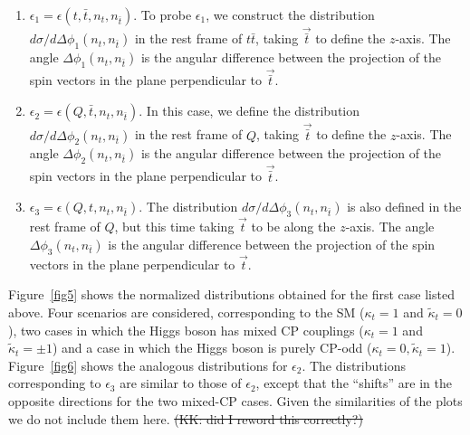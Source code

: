 \documentclass[aps,preprint,tightenlines,floatfix,superscriptaddress,nofootinbib,showpacs]{revtex4-1}
\def\tbar{\bar{t}}
\def\kp{\kappa_t}
\def\kpt{\tilde{\kappa}_t}
\def\TPa{\epsilon(t,\tbar,n_t,n_{\tbar})}
\def\TPb{\epsilon(Q,\tbar,n_t,n_{\tbar})}
\def\TPc{\epsilon(Q,t,n_t,n_{\tbar})}
\providecommand{\DIFdel}[1]{{\protect\color{red}\sout{#1}}}                      %
\providecommand{\DIFdelbegin}{} %
\providecommand{\DIFdelend}{} %
\begin{document}
 \begin{enumerate} 
\item {\boldmath $\epsilon_1 = \TPa$.}  To probe $\epsilon_1$, we construct
  the distribution
  $d\sigma/d\Delta\phi_1(n_t,n_{\tbar})$ in the rest frame of $t\tbar$,
  taking $\vec{\tbar}$ to define the $z$-axis. The angle
  $\Delta\phi_1(n_t,n_{\tbar})$ is the angular difference between the
  projection of the spin vectors in the plane perpendicular to
  $\vec{\tbar}$.
\item {\boldmath $\epsilon_2 = \TPb$.}  In this case, we
  define the distribution
  $d\sigma/d\Delta\phi_2(n_t,n_{\tbar})$ in the rest frame of $Q$, taking
  $\vec{\tbar}$ to define the $z$-axis. The angle
  $\Delta\phi_2(n_t,n_{\tbar})$ is the angular difference between the
  projection of the spin vectors in the plane perpendicular to
  $\vec{\tbar}$.
\item {\boldmath $\epsilon_3 = \TPc$.}  The distribution
  $d\sigma/d\Delta\phi_3(n_t,n_{\tbar})$ is also defined
  in the rest frame of $Q$, but this time taking
  $\vec{t}$ to be along the $z$-axis. The angle $\Delta\phi_3(n_t,n_{\tbar})$
  is the angular difference between the projection of the spin vectors
  in the plane perpendicular to $\vec{t}$.
 \end{enumerate} 
\par
%
Figure~\ref{fig5} shows the normalized distributions obtained
for the first case listed above.
Four scenarios are considered, corresponding to the SM
($\kp= 1$ and $\kpt=0$), two cases in which the Higgs boson
has mixed $\mathrm{CP}$ couplings ($\kp= 1$ and $\kpt=\pm 1$)
and a case in which the Higgs boson is purely 
$\mathrm{CP}$-odd ($\kp= 0,\kpt=1$). Figure~\ref{fig6} shows
the analogous distributions for $\epsilon_2$. The distributions
corresponding to $\epsilon_3$ are similar to those of $\epsilon_2$,
except that the ``shifts'' are in the opposite directions for
the two mixed-$\mathrm{CP}$ cases.  Given the similarities of the
plots we do not include them here. 
\DIFdelbegin %
\DIFdel{(KK: did I reword this correctly?)}%
\DIFdelend %
\end{document}
